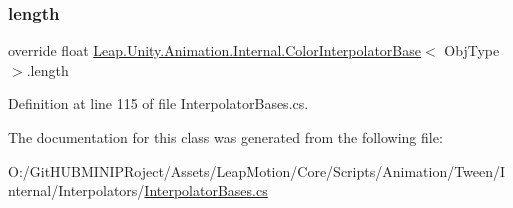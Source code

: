 \subsubsection{\texorpdfstring{length}{length}}
{\footnotesize\ttfamily override float \mbox{\hyperlink{class_leap_1_1_unity_1_1_animation_1_1_internal_1_1_color_interpolator_base}{Leap.\+Unity.\+Animation.\+Internal.\+Color\+Interpolator\+Base}}$<$ Obj\+Type $>$.length\hspace{0.3cm}{\ttfamily [get]}}



Definition at line 115 of file Interpolator\+Bases.\+cs.



The documentation for this class was generated from the following file\+:\begin{DoxyCompactItemize}
\item 
O\+:/\+Git\+H\+U\+B\+M\+I\+N\+I\+P\+Roject/\+Assets/\+Leap\+Motion/\+Core/\+Scripts/\+Animation/\+Tween/\+Internal/\+Interpolators/\mbox{\hyperlink{_interpolator_bases_8cs}{Interpolator\+Bases.\+cs}}\end{DoxyCompactItemize}
